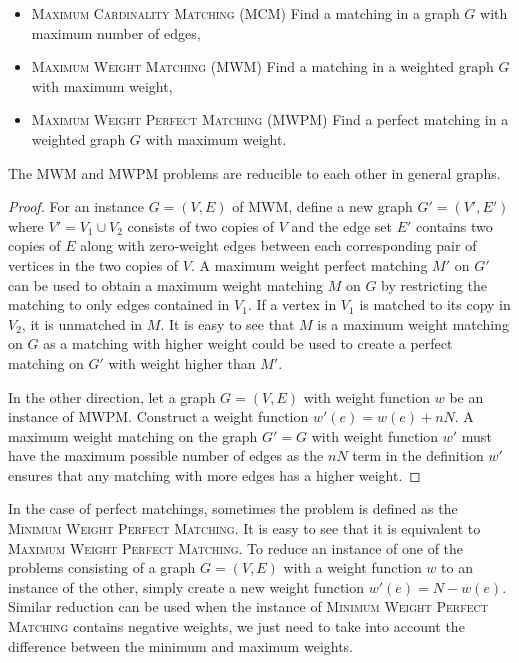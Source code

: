 \begin{itemize}
    \item \textsc{Maximum Cardinality Matching} (\textsc{MCM}) Find a matching in a graph $G$ with maximum number of edges,
    \item \textsc{Maximum Weight Matching} (\textsc{MWM}) Find a matching in a weighted graph $G$ with maximum weight,
    \item \textsc{Maximum Weight Perfect Matching} (\textsc{MWPM}) Find a perfect matching in a weighted graph $G$ with maximum weight.
\end{itemize}

\begin{theorem}\label{thm:reduction}
The \textsc{MWM} and \textsc{MWPM} problems are reducible to each other in general graphs.

\begin{proof}
    For an instance $G=(V, E)$ of \textsc{MWM}, define a new graph $G' = (V', E')$ where $V' = V_1 \cup V_2$ consists of two copies of $V$ and the edge set $E'$ contains two copies of $E$ along with zero-weight edges between each corresponding pair of vertices in the two copies of $V$. A maximum weight perfect matching $M'$ on $G'$ can be used to obtain a maximum weight matching $M$ on $G$ by restricting the matching to only edges contained in $V_1$. If a vertex in $V_1$ is matched to its copy in $V_2$, it is unmatched in $M$. It is easy to see that $M$ is a maximum weight matching on $G$ as a matching with higher weight could be used to create a perfect matching on $G'$ with weight higher than $M'$. 
    
    In the other direction, let a graph $G=(V, E)$ with weight function $w$ be an instance of \textsc{MWPM}. Construct a weight function $w'(e) = w(e) + nN$. A maximum weight matching on the graph $G' = G$ with weight function $w'$ must have the maximum possible number of edges as the $nN$ term in the definition $w'$ ensures that any matching with more edges has a higher weight.    
\end{proof}
\end{theorem}

In the case of perfect matchings, sometimes the problem is defined as the \textsc{Minimum Weight Perfect Matching}. It is easy to see that it is equivalent to \textsc{Maximum Weight Perfect Matching}. To reduce an instance of one of the problems consisting of a graph $G = (V, E)$ with a weight function $w$ to an instance of the other, simply create a new weight function $w'(e) = N - w(e)$. Similar reduction can be used when the instance of \textsc{Minimum Weight Perfect Matching} contains negative weights, we just need to take into account the difference between the minimum and maximum weights.
